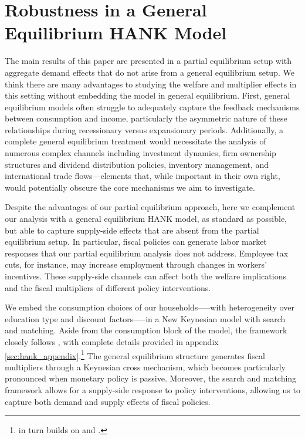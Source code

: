 \documentclass[\econtexRoot/HAFiscal]{subfiles}
\begin{document}
	
\FloatBarrier
\hypertarget{hank}{}\par\section{Robustness in a General Equilibrium HANK Model}
\notinsubfile{\label{sec:hank}}


The main results of this paper are presented in a partial equilibrium setup with aggregate demand effects that do not arise from a general equilibrium setup. We think there are many advantages to studying the welfare and multiplier effects in this setting without embedding the model in general equilibrium.  First, general equilibrium models often struggle to adequately capture the feedback mechanisms between consumption and income, particularly the asymmetric nature of these relationships during recessionary versus expansionary periods. Additionally, a complete general equilibrium treatment would necessitate the analysis of numerous complex channels including investment dynamics, firm ownership structures and dividend distribution policies, inventory management, and international trade flows—elements that, while important in their own right, would potentially obscure the core mechanisms we aim to investigate.



Despite the advantages of our partial equilibrium approach, here we complement our analysis with a  general equilibrium HANK model, as standard as possible, but able to capture supply-side effects that are absent from the partial equilibrium setup. In particular, fiscal policies can generate labor market responses that our partial equilibrium analysis does not address. Employee tax cuts, for instance, may increase employment through changes in workers' incentives. These supply-side channels can affect both the welfare implications and the fiscal multipliers of different policy interventions.



We embed the consumption choices of our households—--with heterogeneity over education type and discount factors—--in a New Keynesian model with search and matching. Aside from the consumption block of the model, the framework closely follows \cite{Du2024}, with complete details provided in appendix \ref{sec:hank_appendix}.\footnote{\cite{Du2024} in turn builds on \cite{Gornemann2016} and \cite{Auclert2020}.} The general equilibrium structure generates fiscal multipliers through a Keynesian cross mechanism, which becomes particularly pronounced when monetary policy is passive. Moreover, the search and matching framework allows for a supply-side response to policy interventions, allowing us to capture both demand and supply effects of fiscal policies.
\end{document}
